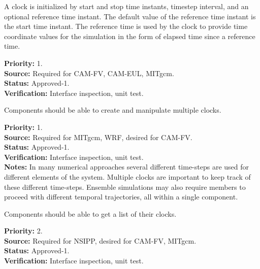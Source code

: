 \label{req:clocks}

A clock is initialized by start and stop time instants, timestep interval,
and an optional reference time instant.  The default value of the reference time 
instant is the start time instant.  The reference time is used by the clock to 
provide time coordinate values for the simulation in the form of elapsed time since a reference time.
\begin{reqlist}
{\bf Priority:} 1. \\
{\bf Source:} Required for CAM-FV, CAM-EUL, MITgcm. \\
{\bf Status:} Approved-1. \\
{\bf Verification:} Interface inspection, unit test. 
\end{reqlist}

Components should be able to create and manipulate multiple clocks.
\begin{reqlist}
{\bf Priority:} 1. \\
{\bf Source:} Required for MITgcm, WRF, desired for CAM-FV. \\
{\bf Status:} Approved-1. \\
{\bf Verification:} Interface inspection, unit test. \\
{\bf Notes:} In many numerical approaches several different time-steps are 
used for different elements of the system. Multiple clocks are important to keep
track of these different time-steps. Ensemble simulations may also require
members to proceed with different temporal trajectories, all within a single 
component.
\end{reqlist}

Components should be able to get a list of their clocks.
\begin{reqlist}
{\bf Priority:} 2. \\
{\bf Source:} Required for NSIPP, desired for CAM-FV, MITgcm. \\
{\bf Status:} Approved-1. \\
{\bf Verification:} Interface inspection, unit test.
\end{reqlist}

